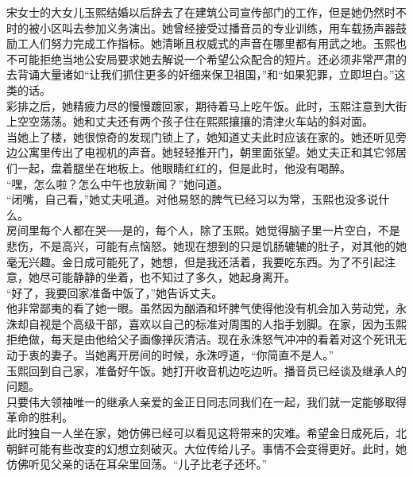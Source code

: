 宋女士的大女儿玉熙结婚以后辞去了在建筑公司宣传部门的工作，但是她仍然时不时的被小区叫去参加义务演出。她曾经接受过播音员的专业训练，用车载扬声器鼓励工人们努力完成工作指标。她清晰且权威式的声音在哪里都有用武之地。玉熙也不可能拒绝当地公安局要求她去解说一个希望公众配合的短片。还必须非常严肃的去背诵大量诸如“让我们抓住更多的奸细来保卫祖国，”和“如果犯罪，立即坦白。”这类的话。\\

彩排之后，她精疲力尽的慢慢踱回家，期待着马上吃午饭。此时，玉熙注意到大街上空空荡荡。她和丈夫还有两个孩子住在熙熙攘攘的清津火车站的斜对面。\\

当她上了楼，她很惊奇的发现门锁上了，她知道丈夫此时应该在家的。她还听见旁边公寓里传出了电视机的声音。她轻轻推开门，朝里面张望。她丈夫正和其它邻居们一起，盘着腿坐在地板上。他眼睛红红的，但是此时，他没有喝醉。\\

“嘿，怎么啦？怎么中午也放新闻？”她问道。\\

“闭嘴，自己看，”她丈夫吼道。对他易怒的脾气已经习以为常，玉熙也没多说什么。\\

房间里每个人都在哭──是的，每个人，除了玉熙。她觉得脑子里一片空白，不是悲伤，不是高兴，可能有点恼怒。她现在想到的只是饥肠辘辘的肚子，对其他的她毫无兴趣。金日成可能死了，她想，但是我还活着，我要吃东西。为了不引起注意，她尽可能静静的坐着，也不知过了多久，她起身离开。\\

“好了，我要回家准备中饭了，”她告诉丈夫。\\

他非常鄙夷的看了她一眼。虽然因为酗酒和坏脾气使得他没有机会加入劳动党，永洙却自视是个高级干部，喜欢以自己的标准对周围的人指手划脚。在家，因为玉熙拒绝做，每天是由他给父子画像掸灰清洁。现在永洙怒气冲冲的看着对这个死讯无动于衷的妻子。当她离开房间的时候，永洙哼道，“你简直不是人。”\\

玉熙回到自己家，准备好午饭。她打开收音机边吃边听。播音员已经谈及继承人的问题。\\

只要伟大领袖唯一的继承人亲爱的金正日同志同我们在一起，我们就一定能够取得革命的胜利。\\

此时独自一人坐在家，她仿佛已经可以看见这将带来的灾难。希望金日成死后，北朝鲜可能有些改变的幻想立刻破灭。大位传给儿子。事情不会变得更好。此时，她仿佛听见父亲的话在耳朵里回荡。“儿子比老子还坏。”\\

